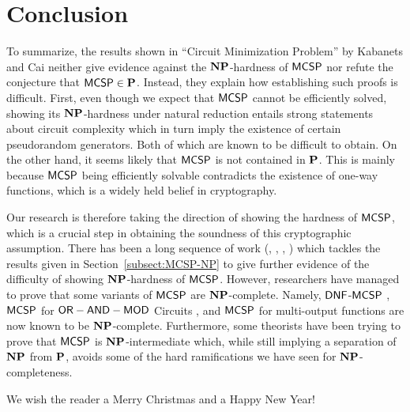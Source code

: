\documentclass[11pt]{article}
\begin{document}
\section{Conclusion}


To summarize, the results shown in ``Circuit Minimization Problem'' by Kabanets and Cai neither give evidence against the $\NP$-hardness of $\mathprob{MCSP}$ nor refute the conjecture that $\mathprob{MCSP} \in \P$. Instead, they explain how
establishing such proofs is difficult.
%
%
First, even though we expect that $\mathprob{MCSP}$ cannot be efficiently solved,
showing its $\NP$-hardness under natural reduction entails strong statements
about circuit complexity which in turn imply the existence of certain
pseudorandom generators. Both of which are known to be difficult to obtain.
%
On the other hand, it seems likely that $\mathprob{MCSP}$ is not contained in $\P$.
This is mainly because $\mathprob{MCSP}$ being efficiently solvable contradicts
the existence of one-way functions, which is a widely held belief in cryptography.

Our research is therefore taking the direction of showing the hardness of $\mathprob{MCSP}$, which is a crucial step in obtaining the soundness of
this cryptographic assumption.
%
There has been a long sequence of work (\cite{hitchcock2015np}, \cite{allender2017minimum}, \cite{murray2017non}, \cite{allender2019new}) which tackles the results given in Section~\ref{subsect:MCSP-NP} to give further evidence of the difficulty of showing $\NP$-hardness of $\mathprob{MCSP}$. However, researchers have managed to prove that some variants of $\mathprob{MCSP}$ are $\NP$-complete. Namely, $\mathprob{DNF}$-$\mathprob{MCSP}$ \cite{masek1979some}, $\mathprob{MCSP}$ for
$\mathprob{OR-AND-MOD}$ Circuits \cite{hirahara2018np}, and $\mathprob{MCSP}$ for multi-output functions \cite{ilango2020np} are now known to be $\NP$-complete. Furthermore, some theorists have been trying to prove that $\mathprob{MCSP}$ is $\NP$-intermediate which, while still implying a separation of $\NP$ from $\P$,
avoids some of the hard ramifications we have seen for $\NP$-completeness.

We wish the reader a Merry Christmas and a Happy New Year!



\end{document}
